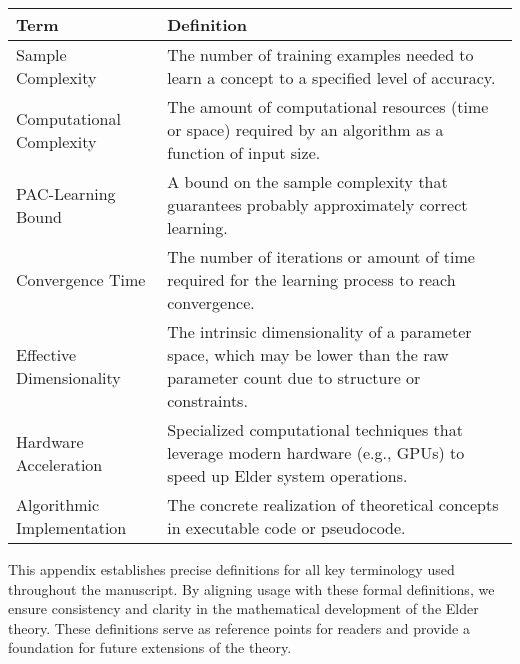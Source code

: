 \begin{center}
\begin{tabular}{|l|p{12cm}|}
\hline
\textbf{Term} & \textbf{Definition} \\
\hline
Sample Complexity & The number of training examples needed to learn a concept to a specified level of accuracy. \\
\hline
Computational Complexity & The amount of computational resources (time or space) required by an algorithm as a function of input size. \\
\hline
PAC-Learning Bound & A bound on the sample complexity that guarantees probably approximately correct learning. \\
\hline
Convergence Time & The number of iterations or amount of time required for the learning process to reach convergence. \\
\hline
Effective Dimensionality & The intrinsic dimensionality of a parameter space, which may be lower than the raw parameter count due to structure or constraints. \\
\hline
Hardware Acceleration & Specialized computational techniques that leverage modern hardware (e.g., GPUs) to speed up Elder system operations. \\
\hline
Algorithmic Implementation & The concrete realization of theoretical concepts in executable code or pseudocode. \\
\hline
\end{tabular}
\label{tab:computational_terminology}
\end{center}

This appendix establishes precise definitions for all key terminology used throughout the manuscript. By aligning usage with these formal definitions, we ensure consistency and clarity in the mathematical development of the Elder theory. These definitions serve as reference points for readers and provide a foundation for future extensions of the theory.